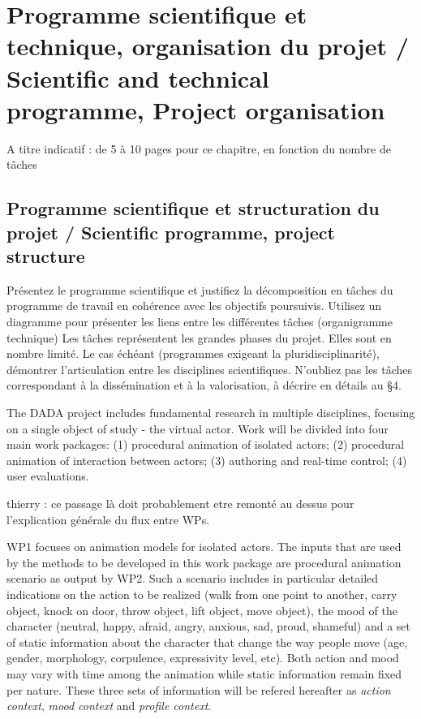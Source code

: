 
\section{Programme scientifique et technique, organisation du projet / Scientific and technical programme, Project organisation}
\begin{xcomment}  
A titre indicatif : de 5 à 10  pages pour ce chapitre, en fonction du nombre de tâches
\end{xcomment}

\subsection{Programme scientifique et structuration du projet  / Scientific programme, project structure}
\begin{xcomment}  
 Pr\'esentez le programme scientifique et justifiez la d\'ecomposition en tâches du programme de travail en coh\'erence avec les objectifs poursuivis. 
Utilisez un diagramme pour pr\'esenter les liens entre les diff\'erentes tâches (organigramme technique)
Les tâches repr\'esentent les grandes phases du projet. Elles sont en nombre limit\'e.
Le cas \'ech\'eant (programmes exigeant la pluridisciplinarit\'e), d\'emontrer l'articulation entre les disciplines scientifiques.
N'oubliez pas les tâches correspondant à la diss\'emination et à la valorisation, à d\'ecrire en d\'etails au §4.

\end{xcomment}

The DADA project includes fundamental research in multiple disciplines, focusing on a single object of study - the virtual actor. Work will be divided into four main work packages: (1) procedural animation of isolated actors; (2) procedural animation of interaction between actors; (3) authoring and real-time control; (4) user evaluations. 


\begin{xcomment}  
thierry : ce passage là doit probablement etre remonté au dessus pour l'explication générale du flux entre WPs. 
\end{xcomment}



WP1 focuses on animation models for isolated actors.  The inputs that are used by the methods to be developed in this work package are procedural animation scenario as output by WP2.  Such a scenario includes in particular detailed indications on the action to be realized (walk from one point to another, carry object, knock on door, throw object, lift object, move object), the mood of the character (neutral, happy, afraid, angry, anxious, sad, proud, shameful) and a set of static information about the character that change the way people move (age, gender, morphology, corpulence, expressivity level, etc). Both action and mood may vary with time among the animation while static information remain fixed per nature.  These three sets of information will be refered hereafter as \textit{action context}, \textit{mood context} and \textit{profile context}. 

